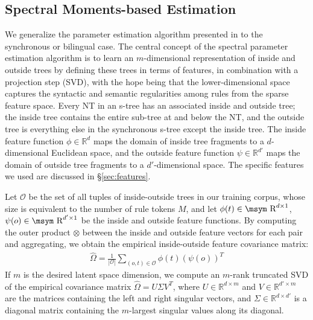 \documentclass[11pt]{article}
\newcommand{\reals}{\mbox{\msym R}}
\begin{document}
\subsection{Spectral Moments-based Estimation}
\label{sec:spectral} 
We generalize the parameter estimation algorithm presented in  to the synchronous or bilingual case. 
The central concept of the spectral parameter estimation algorithm is to learn an $m$-dimensional representation of inside and outside trees by defining these trees in terms of features, in combination with a projection step (SVD), with the hope being that the lower-dimensional space captures the syntactic and semantic regularities among rules from the sparse feature space. 
Every NT in an s-tree has an associated inside and outside tree; the inside tree contains the entire sub-tree at and below the NT, and the outside tree is everything else in the synchronous s-tree except the inside tree.   
The inside feature function $\phi \in \mathbb{R}^d$ maps the domain of inside tree fragments to a $d$-dimensional Euclidean space, and the outside feature function $\psi \in \mathbb{R}^{d'}$ maps the domain of outside tree fragments to a $d'$-dimensional space. 
The specific features we used are discussed in \S\ref{sec:features}.  

Let $\mathcal{O}$ be the set of all tuples of inside-outside trees in our training corpus, whose size is equivalent to the number of rule tokens $M$, and let $\phi(t) \in \reals^{d \times 1}$, $\psi(o) \in \reals^{d' \times 1}$ be the inside and outside feature functions. 
By computing the outer product $\otimes$ between the inside and outside feature vectors for each pair and aggregating, we obtain the empirical inside-outside feature covariance matrix:
\begin{align}
	\hat{\Omega} = \frac{1}{|\mathcal{O}|} \sum_{(o,t) \in \mathcal{O}} \phi(t) \left(\psi(o)\right)^T
	\label{eq:outerproduct}
\end{align}
If $m$ is the desired latent space dimension, we compute an $m$-rank truncated SVD of the empirical covariance matrix $\hat{\Omega} = U \Sigma V^T$, where $U \in \mathbb{R}^{d \times m}$ and $V \in \mathbb{R}^{d' \times m}$ are the matrices containing the left and right singular vectors, and $\Sigma \in \mathbb{R}^{d \times d'}$ is a diagonal matrix containing the $m$-largest singular values along its diagonal.  
\end{document}
